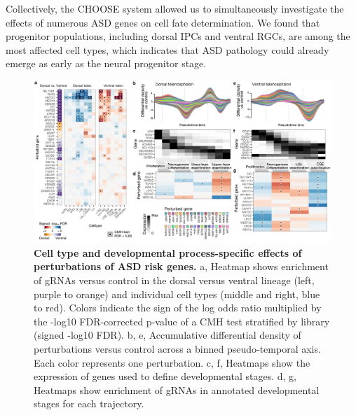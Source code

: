 Collectively, the CHOOSE system allowed us to simultaneously investigate the effects of numerous ASD genes on cell fate determination. We found that progenitor populations, including dorsal IPCs and ventral RGCs, are among the most affected cell types, which indicates that ASD pathology could already emerge as early as the neural progenitor stage.  

\begin{figure}[t!]
    \centering
	\includegraphics[width=\textwidth]{figures/asd/Figure_2}
    \caption{\textbf{Cell type and developmental process-specific effects of perturbations of ASD risk genes.}
    a, Heatmap shows enrichment of gRNAs versus control in the dorsal versus ventral lineage (left, purple to orange) and individual cell types (middle and right, blue to red). Colors indicate the sign of the log odds ratio multiplied by the -log10 FDR-corrected p-value of a CMH test stratified by library (signed -log10 FDR). b, e, Accumulative differential density of perturbations versus control across a binned pseudo-temporal axis. Each color represents one perturbation. c, f, Heatmaps show the expression of genes used to define developmental stages. d, g, Heatmaps show enrichment of gRNAs in annotated developmental stages for each trajectory.}
    \label{fig:asd2}
\end{figure}

